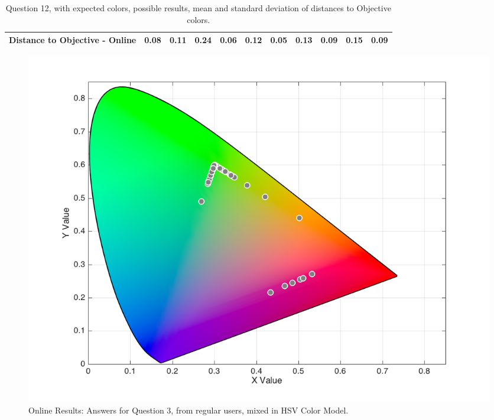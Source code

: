 \begin{table}[H]
{\begin{tabular}{lccccccccccccc}
    \multicolumn{4}{l}{Distance to Objective - Online}                                                                                               & \multicolumn{1}{|c}{\textbf{0.08}}        & \multicolumn{1}{c|}{0.11}    & \multicolumn{1}{|c}{0.24}        & \multicolumn{1}{c|}{0.06}    & \multicolumn{1}{|c}{0.12}       & \multicolumn{1}{c|}{0.05}    & \multicolumn{1}{|c}{0.13}        & \multicolumn{1}{c|}{0.09}    & \multicolumn{1}{|c}{0.15}       & \multicolumn{1}{c|}{0.09}    \\ \hline
    \end{tabular}}
  \caption[Question 12, with expected Results.]{Question 12, with expected colors, possible results, mean and standard deviation of distances to Objective colors.}
  \label{table:lab_q12_expected}
\end{table}
%
\begin{figure}[htbp]
  \centering
  \begin{minipage}{0.48\textwidth}
    \centering
    \includegraphics[width=\textwidth]{images/results/3_online_HSVresponses.png}
    \caption[Online Results: Answers for Question 3, from regular users, mixed in HSV Color Model.]{Online Results: Answers for Question 3, from regular users, mixed in HSV Color Model.}
    \label{fig:onlinehsvregular_3}
  \end{minipage}\hfill
  \begin{minipage}{0.48\textwidth}
    \centering

\end{minipage}
\end{figure}
